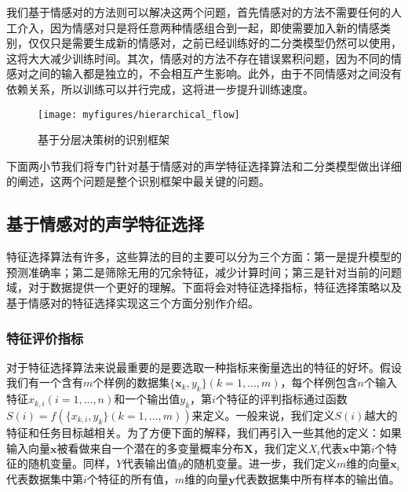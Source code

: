 我们基于情感对的方法则可以解决这两个问题，首先情感对的方法不需要任何的人工介入，因为情感对只是将任意两种情感组合到一起，即使需要加入新的情感类别，仅仅只是需要生成新的情感对，之前已经训练好的二分类模型仍然可以使用，这将大大减少训练时间。其次，情感对的方法不存在错误累积问题，因为不同的情感对之间的输入都是独立的，不会相互产生影响。此外，由于不同情感对之间没有依赖关系，所以训练可以并行完成，这将进一步提升训练速度。

\begin{figure}[htb] %
    \vspace{-0.8cm}  %
    \setlength{\belowcaptionskip}{0cm}   %
    \centering
    \texttt{[image: myfigures/hierarchical\_flow]}
    \caption{基于分层决策树的识别框架}
    \label{fig:hierarchical_flow}
\end{figure}

下面两小节我们将专门针对基于情感对的声学特征选择算法和二分类模型做出详细的阐述，这两个问题是整个识别框架中最关键的问题。

\subsection{基于情感对的声学特征选择}
\label{ssec:emo_pair_feature_select}
特征选择算法有许多，这些算法的目的主要可以分为三个方面：第一是提升模型的预测准确率；第二是筛除无用的冗余特征，减少计算时间；第三是针对当前的问题域，对于数据提供一个更好的理解。下面将会对特征选择指标，特征选择策略以及基于情感对的特征选择实现这三个方面分别作介绍。

\subsubsection{特征评价指标}
\label{sssec:feature_select_metrics}
对于特征选择算法来说最重要的是要选取一种指标来衡量选出的特征的好坏。假设我们有一个含有$m$个样例的数据集$\{\mathbf{x}_k, y_k\}(k=1,...,m)$，每个样例包含$n$个输入特征$x_{k,i}(i=1,...,n)$和一个输出值$y_k$，第$i$个特征的评判指标通过函数$S(i)=f(\{x_{k,i}, y_k\}(k=1,...,m))$来定义。一般来说，我们定义$S(i)$越大的特征和任务目标越相关。为了方便下面的解释，我们再引入一些其他的定义：如果输入向量$\mathbf{x}$被看做来自一个潜在的多变量概率分布$\mathbf{X}$，我们定义$X_i$代表$\mathbf{x}$中第$i$个特征的随机变量。同样，$Y$代表输出值$y$的随机变量。进一步，我们定义$m$维的向量$\mathbf{x}_i$代表数据集中第$i$个特征的所有值，$m$维的向量$\mathbf{y}$代表数据集中所有样本的输出值。

